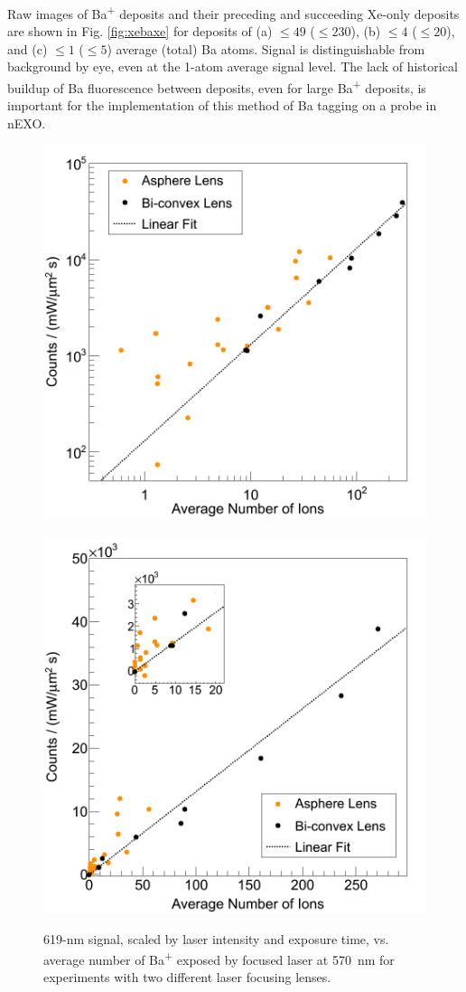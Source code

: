 Raw images of Ba\textsuperscript{+} deposits and their preceding and succeeding Xe-only deposits are shown in Fig. \ref{fig:xebaxe} for deposits of (a) $\leq 49$ ($\leq 230$), (b) $\leq 4$ ($\leq 20$), and (c) $\leq 1$ ($\leq 5$) average (total) Ba atoms.   Signal is distinguishable from background by eye, even at the 1-atom average signal level.  The lack of historical buildup of Ba fluorescence between deposits, even for large Ba\textsuperscript{+} deposits, is important for the implementation of this method of Ba tagging on a probe in nEXO.


\begin{figure} %
        \centering
                \includegraphics[width=.5\textwidth]{figures/lin_20150526and20150807_log.png}
                ~
                \includegraphics[width=.5\textwidth]{figures/lin_20150526and20150807_lin.png}
                \caption{619-nm signal, scaled by laser intensity and exposure time, vs. average number of Ba\textsuperscript{+} exposed by focused laser at 570~nm for experiments with two different laser focusing lenses.} %
\label{fig:lin}
\end{figure}

